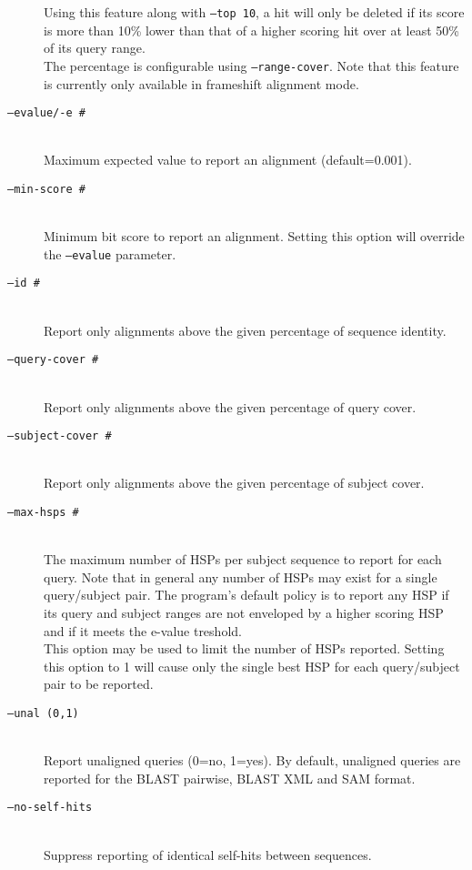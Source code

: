 \documentclass[11pt]{article}
\begin{document}
\begin{description}
Using this feature along with \texttt{--top 10}, a hit will only be deleted if its score is more than 10\% lower than that of a higher scoring hit over at least 50\% of its query range.\\
The percentage is configurable using \texttt{--range-cover}. Note that this feature is currently only available in frameshift alignment mode.
\item[\texttt{--evalue/-e \#}]\hfill\\
Maximum expected value to report an alignment (default=0.001).
\item[\texttt{--min-score \#}]\hfill\\
Minimum bit score to report an alignment. Setting this option will override the \texttt{--evalue} parameter.
\item[\texttt{--id \#}]\hfill\\
Report only alignments above the given percentage of sequence identity.
\item[\texttt{--query-cover \#}]\hfill\\
Report only alignments above the given percentage of query cover.
\item[\texttt{--subject-cover \#}]\hfill\\
Report only alignments above the given percentage of subject cover.
\item[\texttt{--max-hsps \#}]\hfill\\
The maximum number of HSPs per subject sequence to report for each query. Note that in general any number of HSPs may exist for a single query/subject pair. The program's default policy is to report any HSP if its query and subject ranges are not enveloped by a higher scoring HSP and if it meets the e-value treshold.\\
This option may be used to limit the number of HSPs reported. Setting this option to 1 will cause only the single best HSP for each query/subject pair to be reported.
\item[\texttt{--unal (0,1)}]\hfill\\
Report unaligned queries (0=no, 1=yes). By default, unaligned queries are reported for the BLAST pairwise, BLAST XML and SAM format.
\item[\texttt{--no-self-hits}]\hfill\\
Suppress reporting of identical self-hits between sequences.
\end{description}
\end{document}
